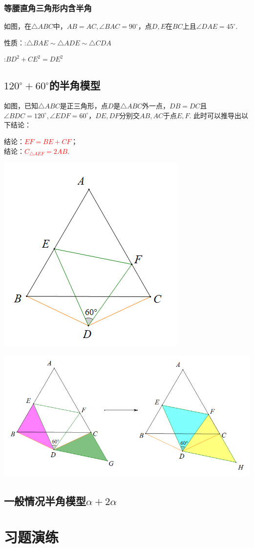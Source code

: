 \documentclass[10pt]{ctexart}
\begin{document}
\subsubsection{等腰直角三角形内含半角}
如图，在$\triangle ABC$中，$AB=AC,\angle BAC=90^\circ$，点$D,E$在$BC$上且$\angle DAE=45^\circ$.

性质：:$\triangle BAE \sim \triangle ADE \sim \triangle CDA$

:$BD^2+CE^2=DE^2$




\subsection{$120^\circ +60^\circ$的半角模型}
\begin{minipage}{0.6\textwidth}
	如图，已知$\triangle ABC$是正三角形，点$D$是$\triangle ABC$外一点，$DB=DC$且$\angle BDC=120^\circ,\angle EDF=60^\circ$，$DE,DF$分别交$AB,AC$于点$E,F$.
	此时可以推导出以下结论：
	
	结论：\textcolor{red}{$EF=BE+CF$}；\\
	结论：\textcolor{red}{$C_{\triangle AEF}=2AB$}.
\end{minipage}\qquad\qquad
\begin{minipage}{0.4\textwidth}
\includegraphics[scale=0.4]{figure/banjiao10.PNG}
\end{minipage}
\includegraphics[scale=0.4]{figure/banjiao11.PNG}

\subsection{一般情况半角模型$\alpha +2\alpha$}




\section{习题演练}
\end{document}
